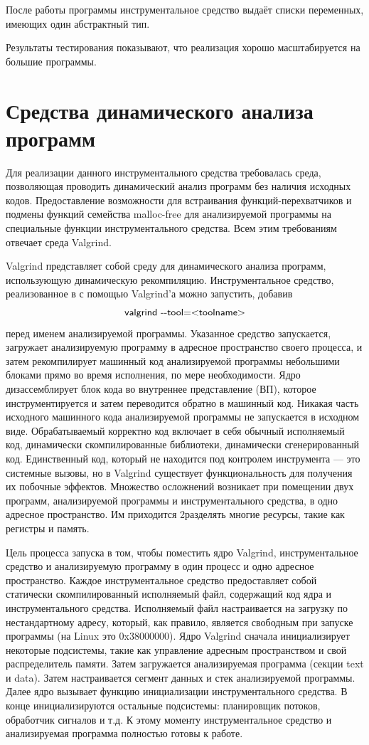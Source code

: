 \documentclass[a4paper,12pt,russian]{article}
\newcommand{\code}[1]{\textsf{#1}}
\begin{document}
После работы программы инструментальное средство выдаёт списки переменных, имеющих один абстрактный тип.

Результаты тестирования показывают, что реализация хорошо масштабируется на большие программы.

\newpage
\section{Средства динамического анализа программ}
\label{valgrind_section}
Для реализации данного инструментального средства требовалась среда, позволяющая проводить динамический анализ программ без наличия исходных кодов.
Предоставление возможности для встраивания функций-перехватчиков и подмены функций семейства \code{malloc-free} для анализируемой программы на специальные функции инструментального средства.
Всем этим требованиям отвечает среда \code{Valgrind}.

\code{Valgrind} представляет собой среду для динамического анализа программ, использующую динамическую рекомпиляцию.
Инструментальное средство, реализованное в с помощью \code{Valgrind}'а можно запустить, добавив \[\mbox{\code{valgrind -{}-tool=<toolname>}}\] перед именем анализируемой программы. Указанное средство запускается, загружает анализируемую программу в адресное пространство своего процесса, и затем рекомпилирует машинный код анализируемой программы небольшими блоками прямо во время исполнения, по мере необходимости.
Ядро дизассемблирует блок кода во внутреннее представление (ВП), которое инструментируется и затем переводится обратно в машинный код.
Никакая часть исходного машинного кода анализируемой программы не запускается в исходном виде. Обрабатываемый корректно код включает в себя обычный исполняемый код, динамически скомпилированные библиотеки, динамически сгенерированный код. Единственный код, который не находится под контролем инструмента --- это системные вызовы, но в \code{Valgrind} существует функциональность для получения их побочные эффектов. Множество осложнений возникает при помещении двух программ, анализируемой программы и инструментального средства, в одно адресное пространство. Им приходится 2разделять многие ресурсы, такие как регистры и память.

Цель процесса запуска в том, чтобы поместить ядро \code{Valgrind}, инструментальное средство и анализируемую программу в один процесс и одно адресное пространство. Каждое инструментальное средство предоставляет собой статически скомпилированный исполняемый файл, содержащий код ядра и инструментального средства. Исполняемый файл настраивается на загрузку по нестандартному адресу, который, как правило, является свободным при запуске программы (на Linux это \code{0x38000000}). Ядро \code{Valgrind} сначала инициализирует некоторые подсистемы, такие как управление адресным пространством и свой распределитель памяти. Затем загружается анализируемая программа (секции \code{text} и \code{data}). Затем настраивается сегмент данных и стек анализируемой программы. Далее ядро вызывает функцию инициализации инструментального средства. В конце инициализируются остальные подсистемы: планировщик потоков, обработчик сигналов и т.д. К этому моменту инструментальное средство и анализируемая программа полностью готовы к работе.
\end{document}
